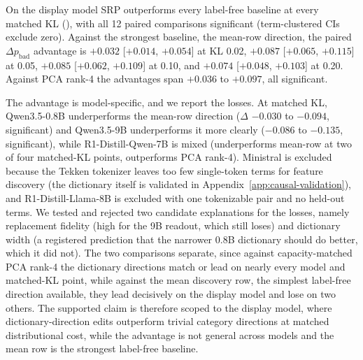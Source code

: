 On the display model SRP outperforms every label-free
baseline at every matched KL
(), with all 12 paired comparisons significant
(term-clustered CIs exclude zero). Against the strongest baseline, the
mean-row direction, the paired \(\Delta p_{\mathrm{bad}}\) advantage is
\(+0.032\) [\(+0.014\), \(+0.054\)] at KL 0.02, \(+0.087\)
[\(+0.065\), \(+0.115\)] at 0.05, \(+0.085\) [\(+0.062\), \(+0.109\)]
at 0.10, and \(+0.074\) [\(+0.048\), \(+0.103\)] at 0.20. Against PCA
rank-4 the advantages span \(+0.036\) to \(+0.097\), all significant.

The advantage is model-specific, and we report the losses. At matched KL,
Qwen3.5-0.8B underperforms the mean-row direction (\(\Delta\) \(-0.030\) to
\(-0.094\), significant) and Qwen3.5-9B underperforms it more clearly (\(-0.086\)
to \(-0.135\), significant), while R1-Distill-Qwen-7B is mixed (underperforms
mean-row at two of four matched-KL points, outperforms PCA rank-4). Ministral
is excluded because the Tekken tokenizer leaves too few single-token
terms for feature discovery (the dictionary itself is validated in
Appendix~\ref{app:causal-validation}), and R1-Distill-Llama-8B is
excluded with one tokenizable pair and no held-out terms. We tested and
rejected two candidate explanations for the losses, namely replacement
fidelity (high for the 9B readout, which still loses) and dictionary width (a registered prediction that the
narrower 0.8B dictionary should do better, which it did not). The two
comparisons separate, since against capacity-matched PCA rank-4 the
dictionary directions match or lead on nearly every model and
matched-KL point, while against the mean discovery row, the simplest
label-free direction available, they lead decisively on the display
model and lose on two others. The supported claim is therefore scoped
to the display model, where dictionary-direction edits outperform
trivial category directions at matched distributional cost, while the
advantage is not general across models and the mean row is
the strongest label-free baseline.

